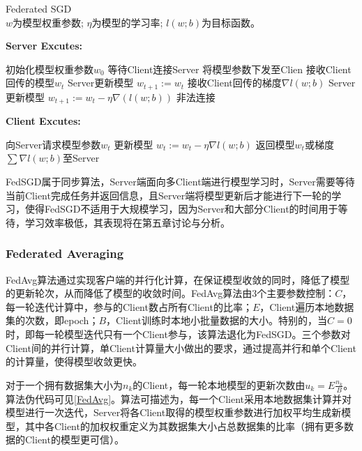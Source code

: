 \documentclass[zihao = -4,cn]{oucart}
\begin{document}
\begin{algorithm}[h]
	\caption{Federated SGD
		\\$w$为模型权重参数; $\eta$为模型的学习率; $l(w;b)$为目标函数。}
	\label{FedSGDServer}
	{\bfseries Server Excutes:}
	\begin{algorithmic}
		\STATE 初始化模型权重参数$w_0$
		\REPEAT
		\STATE 等待Client连接Server
		\STATE 将模型参数下发至Clien
		\STATE 接收Client回传的模型$w_t$
		\STATE Server更新模型 $w_{t+1} := w_{t}$
		\STATE 接收Client回传的梯度$\nabla{l(w;b)}$
		\STATE Server更新模型 $w_{t+1} := w_t - \eta\nabla(l(w;b))$
		\ELSE
		\STATE 非法连接
		\ENDIF
	\end{algorithmic}
	{\bfseries Client Excutes:}
	\begin{algorithmic}
		\STATE 向Server请求模型参数$w_t$
		\FOR{batch $b \in B$}
		\STATE 更新模型 $w_t := w_t-\eta\nabla{l(w;b)}$
		\ENDFOR
		\STATE 返回模型$w_t$或梯度$\sum{\nabla{l(w;b)}}$至Server 
	\end{algorithmic}
\end{algorithm}

FedSGD属于同步算法，Server端面向多Client端进行模型学习时，Server需要等待当前Client完成任务并返回信息，且Server端将模型更新后才能进行下一轮的学习，使得FedSGD不适用于大规模学习，因为Server和大部分Client的时间用于等待，学习效率极低，其表现将在第五章讨论与分析。

%
\subsubsection{Federated Averaging}
FedAvg算法通过实现客户端的并行化计算，在保证模型收敛的同时，降低了模型的更新轮次，从而降低了模型的收敛时间。FedAvg算法由3个主要参数控制：$C$，每一轮迭代计算中，参与的Client数占所有Client的比率；$E$，Client遍历本地数据集的次数，即epoch；$B$，Client训练时本地小批量数据的大小。特别的，当$C=0$时，即每一轮模型迭代只有一个Client参与，该算法退化为FedSGD。三个参数对Client间的并行计算，单Client计算量大小做出的要求，通过提高并行和单个Client的计算量，使得模型收敛更快。\par
对于一个拥有数据集大小为$n_k$的Client，每一轮本地模型的更新次数由$u_k = E\frac{n_k}{B}$。算法伪代码可见\ref{FedAvg}。算法可描述为，每一个Client采用本地数据集计算并对模型进行一次迭代，Server将各Client取得的模型权重参数进行加权平均生成新模型，其中各Client的加权权重定义为其数据集大小占总数据集的比率（拥有更多数据的Client的模型更可信）。
%
\end{document}
